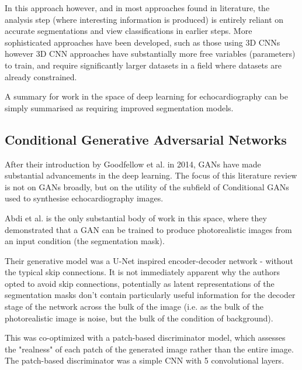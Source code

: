 In this approach however, and in most approaches found in literature, the
analysis step (where interesting information is produced) is entirely reliant on
accurate segmentations and view classifications in earlier steps. More
sophisticated approaches have been developed, such as those using 3D CNNs
\cite{ouyangEchoNetDynamicLargeNew} however 3D CNN approaches have substantially
more free variables (parameters) to train, and require significantly larger
datasets in a field where datasets are already constrained. \newline

A summary for work in the space of deep learning for echocardiography can be
simply summarised as requiring improved segmentation models. \newline

\subsection{Conditional Generative Adversarial Networks}

After their introduction by Goodfellow et al. in 2014, GANs have made
substantial advancements in the deep learning. The focus of this literature
review is not on GANs broadly, but on the utility of the subfield of Conditional
GANs used to synthesise echocardiography images. \newline

Abdi et al. is the only substantial body of work in this space, where they
demonstrated that a GAN can be trained to produce photorealistic
images from an input condition (the segmentation mask). \newline

Their generative model was a U-Net inspired encoder-decoder network - without
the typical skip connections. It is not immediately apparent why the authors
opted to avoid skip connections, potentially as latent representations of the
segmentation masks don't contain particularly useful information for the decoder
stage of the network across the bulk of the image (i.e. as the bulk of the photorealistic image
is noise, but the bulk of the condition of background). \newline

This was co-optimized with a patch-based discriminator model, which assesses
the "realness" of each patch of the generated image rather than the entire
image. The patch-based discriminator was a simple CNN with 5 convolutional
layers. \newline

